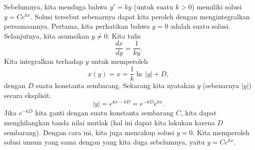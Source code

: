 \begin{example}
Sebelumnya, kita menduga bahwa $y' = ky$ (untuk suatu $k > 0$) memiliki solusi
$y=Ce^{kx}$. Solusi tersebut sebenarnya dapat kita peroleh dengan mengintegralkan persamaannya.
Pertama, kita perhatikan bahwa $y=0$ adalah suatu solusi.
Selanjutnya, kita asumsikan $y \neq 0$. Kita tulis
\begin{equation*}
\frac{dx}{dy} = \frac{1}{ky} .
\end{equation*}
Kita integralkan terhadap $y$ untuk memperoleh
\begin{equation*}
x(y) = x = \frac{1}{k} \ln \, \lvert y \rvert + D,
\end{equation*}
dengan $D$ suatu konstanta sembarang.
Sekarang kita nyatakan $y$ (sebenarnya $\lvert y \rvert$) secara eksplisit.
\begin{equation*}
\lvert y \rvert =
e^{kx-kD} =
e^{-kD} e^{k x} .
\end{equation*}
Jika $e^{-kD}$ kita ganti dengan suatu konstanta sembarang $C$, kita dapat
menghilangkan tanda nilai mutlak (hal ini dapat kita lakukan karena $D$ sembarang). Dengan
cara ini, kita
juga mencakup solusi $y=0$. Kita memperoleh solusi umum yang sama dengan yang
kita duga sebelumnya, yaitu $y = Ce^{kx}$.
\end{example}


